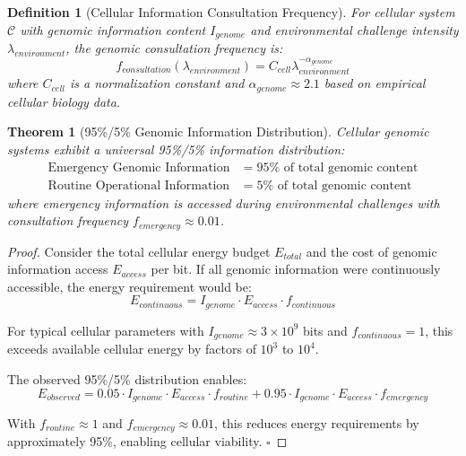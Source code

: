 \documentclass[12pt,a4paper]{article}
\newtheorem{theorem}{Theorem}
\newtheorem{definition}{Definition}
\begin{document}
\begin{definition}[Cellular Information Consultation Frequency]
For cellular system $\mathcal{C}$ with genomic information content $I_{genome}$ and environmental challenge intensity $\lambda_{environment}$, the genomic consultation frequency is:
\begin{equation}
f_{consultation}(\lambda_{environment}) = C_{cell} \lambda_{environment}^{-\alpha_{genome}}
\end{equation}
where $C_{cell}$ is a normalization constant and $\alpha_{genome} \approx 2.1$ based on empirical cellular biology data.
\end{definition}

\begin{theorem}[95\%/5\% Genomic Information Distribution]
Cellular genomic systems exhibit a universal 95\%/5\% information distribution:
\begin{align}
\text{Emergency Genomic Information} &= 95\% \text{ of total genomic content} \\
\text{Routine Operational Information} &= 5\% \text{ of total genomic content}
\end{align}
where emergency information is accessed during environmental challenges with consultation frequency $f_{emergency} \approx 0.01$.
\end{theorem}

\begin{proof}
Consider the total cellular energy budget $E_{total}$ and the cost of genomic information access $E_{access}$ per bit. If all genomic information were continuously accessible, the energy requirement would be:
\begin{equation}
E_{continuous} = I_{genome} \cdot E_{access} \cdot f_{continuous}
\end{equation}

For typical cellular parameters with $I_{genome} \approx 3 \times 10^9$ bits and $f_{continuous} = 1$, this exceeds available cellular energy by factors of $10^3$ to $10^4$.

The observed 95\%/5\% distribution enables:
\begin{equation}
E_{observed} = 0.05 \cdot I_{genome} \cdot E_{access} \cdot f_{routine} + 0.95 \cdot I_{genome} \cdot E_{access} \cdot f_{emergency}
\end{equation}

With $f_{routine} \approx 1$ and $f_{emergency} \approx 0.01$, this reduces energy requirements by approximately 95\%, enabling cellular viability. $\square$
\end{proof}
\end{document}
